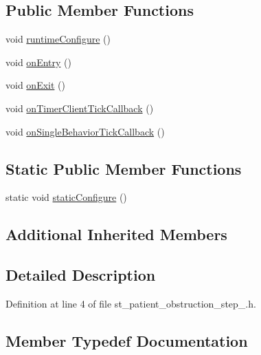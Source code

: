 \subsection*{Public Member Functions}
\begin{DoxyCompactItemize}
\item 
void \hyperlink{structsm__respira__1_1_1StPatientObstructionStep1_a99ac90de739317e8c0c47916fafd057a}{runtime\+Configure} ()
\item 
void \hyperlink{structsm__respira__1_1_1StPatientObstructionStep1_abf880550f32fc9a0013f72862b08b585}{on\+Entry} ()
\item 
void \hyperlink{structsm__respira__1_1_1StPatientObstructionStep1_a9db651db42809f269204c64762f3bad8}{on\+Exit} ()
\item 
void \hyperlink{structsm__respira__1_1_1StPatientObstructionStep1_a330f5d86b827dedd1ca72d7356215c49}{on\+Timer\+Client\+Tick\+Callback} ()
\item 
void \hyperlink{structsm__respira__1_1_1StPatientObstructionStep1_a87a086647c2ec7b38f86f17d2719c89b}{on\+Single\+Behavior\+Tick\+Callback} ()
\end{DoxyCompactItemize}
\subsection*{Static Public Member Functions}
\begin{DoxyCompactItemize}
\item 
static void \hyperlink{structsm__respira__1_1_1StPatientObstructionStep1_a935f38ebd60546b7c6e03655d041206d}{static\+Configure} ()
\end{DoxyCompactItemize}
\subsection*{Additional Inherited Members}


\subsection{Detailed Description}


Definition at line 4 of file st\+\_\+patient\+\_\+obstruction\+\_\+step\+\_.\+h.



\subsection{Member Typedef Documentation}
\mbox{\label{structsm__respira__1_1_1StPatientObstructionStep1_a3dbf13d6ef34e327ff7fd96006be763e}} 
